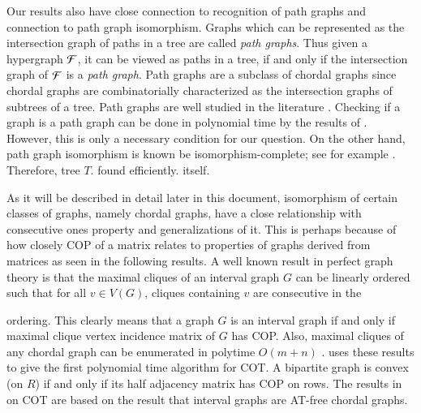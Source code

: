 \documentclass[MS,synopsis]{iitmdiss}
\begin{document}
Our results also have close connection to recognition of path graphs
and connection to path graph isomorphism.  Graphs which can be
represented as the intersection graph of paths in a tree are called
{\em path graphs}\cite{mcg04}. Thus given a hypergraph ${\cal F}$, it can
be viewed as paths in a tree, if and only if the intersection graph of
${\cal F}$ is a {\em path graph}. Path graphs are a subclass of chordal
graphs since chordal graphs are combinatorially characterized as the
intersection graphs of subtrees of a tree.  Path graphs are well
studied in the literature \cite{plr70,gav78,bp93,mcg04}.  Checking if
a graph is a path graph can be done in polynomial time by the results
of \cite{gav78,aas93}.  However, this is only a necessary condition
for our question.    On the other hand, path graph isomorphism is known
be isomorphism-complete; see for example \cite{kklv10}. Therefore,
 tree $T$.
 found efficiently.   itself.



As it will be described in detail later in this document, isomorphism
of certain classes of graphs, namely chordal graphs, have a close
relationship with consecutive ones property and generalizations of it.
This is perhaps because of how closely COP of a matrix relates to
properties of graphs derived from matrices as seen in the following
results. %
A well known result in perfect graph theory is that the maximal
cliques of an interval graph $G$ can be linearly ordered such that for
all $v \in V(G)$, cliques containing $v$ are consecutive in the

ordering\cite{gh64}. This clearly means that a graph $G$ is an
interval graph if and only if  maximal clique vertex incidence matrix of $G$
has COP.  Also, maximal cliques of any chordal graph can be enumerated
in polytime $O(m+n)$ .  \cite{fg65} uses these
results to give the first polynomial time algorithm for
COT.   A bipartite graph
is convex (on $R$) if and only if its half adjacency matrix has COP on
rows.  The results in \cite{bl76}
on COT are based on the result that
interval graphs are AT-free chordal graphs. 
\end{document}
